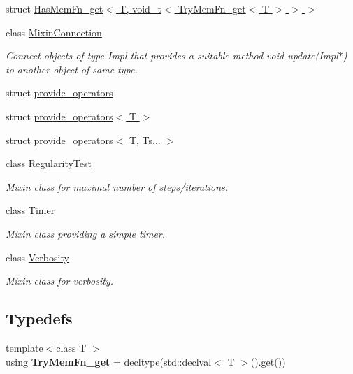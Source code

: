 \begin{DoxyCompactItemize}
\item 
struct \hyperlink{structSpacy_1_1Mixin_1_1HasMemFn__get_3_01T_00_01void__t_3_01TryMemFn__get_3_01T_01_4_01_4_01_4}{Has\+Mem\+Fn\+\_\+get$<$ T, void\+\_\+t$<$ Try\+Mem\+Fn\+\_\+get$<$ T $>$ $>$ $>$}
\item 
class \hyperlink{classSpacy_1_1Mixin_1_1MixinConnection}{Mixin\+Connection}
\begin{DoxyCompactList}\small\item\em Connect objects of type Impl that provides a suitable method void update(\+Impl$\ast$) to another object of same type. \end{DoxyCompactList}\item 
struct \hyperlink{structSpacy_1_1Mixin_1_1provide__operators}{provide\+\_\+operators}
\item 
struct \hyperlink{structSpacy_1_1Mixin_1_1provide__operators_3_01T_01_4}{provide\+\_\+operators$<$ T $>$}
\item 
struct \hyperlink{structSpacy_1_1Mixin_1_1provide__operators_3_01T_00_01Ts_8_8_8_01_4}{provide\+\_\+operators$<$ T, Ts... $>$}
\item 
class \hyperlink{classSpacy_1_1Mixin_1_1RegularityTest}{Regularity\+Test}
\begin{DoxyCompactList}\small\item\em Mixin class for maximal number of steps/iterations. \end{DoxyCompactList}\item 
class \hyperlink{classSpacy_1_1Mixin_1_1Timer}{Timer}
\begin{DoxyCompactList}\small\item\em Mixin class providing a simple timer. \end{DoxyCompactList}\item 
class \hyperlink{classSpacy_1_1Mixin_1_1Verbosity}{Verbosity}
\begin{DoxyCompactList}\small\item\em Mixin class for verbosity. \end{DoxyCompactList}\end{DoxyCompactItemize}
\subsection*{Typedefs}
\begin{DoxyCompactItemize}
\item 
{\footnotesize template$<$class T $>$ }\\using {\bfseries Try\+Mem\+Fn\+\_\+get} = decltype(std\+::declval$<$ T $>$().get())\hypertarget{namespaceSpacy_1_1Mixin_a23898b82050095f41022bb7765ecdfe7}{}\label{namespaceSpacy_1_1Mixin_a23898b82050095f41022bb7765ecdfe7}

\end{DoxyCompactItemize}
